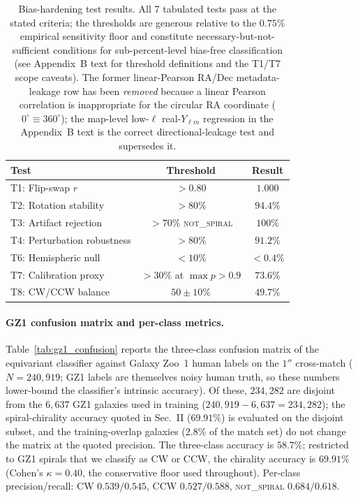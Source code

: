 \documentclass[aps,prd,twocolumn,superscriptaddress,preprintnumbers,nofootinbib,longbibliography,floatfix]{revtex4-2}
\newcommand{\NS}{\textsc{not\_spiral}}
\begin{document}
\begin{table}[t]
\caption{\label{tab:bias_tests}Bias-hardening test results. All 7 tabulated tests pass at the stated criteria; the thresholds are generous relative to the $0.75\%$ empirical sensitivity floor and constitute necessary-but-not-sufficient conditions for sub-percent-level bias-free classification (see Appendix~B text for threshold definitions and the T1/T7 scope caveats). The former linear-Pearson RA/Dec metadata-leakage row has been \emph{removed} because a linear Pearson correlation is inappropriate for the circular RA coordinate ($0^\circ\!\equiv\!360^\circ$); the map-level low-$\ell$ real-$Y_{\ell m}$ regression in the Appendix~B text is the correct directional-leakage test and supersedes it.}
\begin{ruledtabular}
\begin{tabular}{lcc}
\textbf{Test} & \textbf{Threshold} & \textbf{Result} \\
\hline
T1: Flip-swap $r$ & $>0.80$ & $1.000$ \\
T2: Rotation stability & $>80\%$ & $94.4\%$ \\
T3: Artifact rejection & $>70\%$ \NS{} & $100\%$ \\
T4: Perturbation robustness & $>80\%$ & $91.2\%$ \\
T6: Hemispheric null & $<10\%$ & $<0.4\%$ \\
T7: Calibration proxy & $>30\%$ at $\max p\!>\!0.9$ & $73.6\%$ \\
T8: CW/CCW balance & $50\pm10\%$ & $49.7\%$ \\
\end{tabular}
\end{ruledtabular}
\end{table}

\paragraph{GZ1 confusion matrix and per-class metrics.}
Table~\ref{tab:gz1_confusion} reports the three-class confusion matrix of the equivariant classifier against Galaxy Zoo~1 human labels on the $1''$ cross-match ($N\!=\!240{,}919$; GZ1 labels are themselves noisy human truth, so these numbers lower-bound the classifier's intrinsic accuracy). Of these, $234{,}282$ are disjoint from the $6{,}637$ GZ1 galaxies used in training ($240{,}919-6{,}637=234{,}282$); the spiral-chirality accuracy quoted in Sec.~II ($69.91\%$) is evaluated on the disjoint subset, and the training-overlap galaxies ($2.8\%$ of the match set) do not change the matrix at the quoted precision. The three-class accuracy is $58.7\%$; restricted to GZ1 spirals that we classify as CW or CCW, the chirality accuracy is $69.91\%$ (Cohen's $\kappa\!=\!0.40$, the conservative floor used throughout). Per-class precision/recall: CW $0.539/0.545$, CCW $0.527/0.588$, \NS{} $0.684/0.618$.
\end{document}
